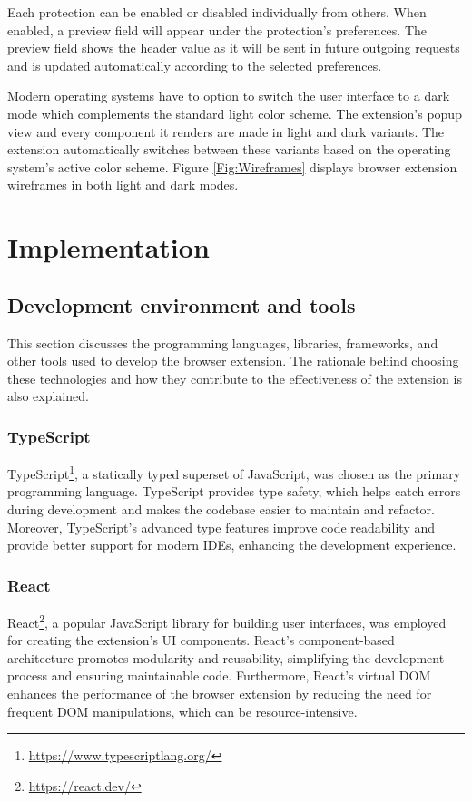 Each protection can be enabled or disabled individually from others. When enabled, a preview field will appear under the protection's preferences. The preview field shows the header value as it will be sent in future outgoing requests and is updated automatically according to the selected preferences.

Modern operating systems have to option to switch the user interface to a dark mode which complements the standard light color scheme. The extension's popup view and every component it renders are made in light and dark variants. The extension automatically switches between these variants based on the operating system's active color scheme. Figure \ref{Fig:Wireframes} displays browser extension wireframes in both light and dark modes.

\chapter{Implementation}


\section{Development environment and tools}

This section discusses the programming languages, libraries, frameworks, and other tools used to develop the browser extension. The rationale behind choosing these technologies and how they contribute to the effectiveness of the extension is also explained.

\subsection{TypeScript}

TypeScript\footnote{\url{https://www.typescriptlang.org/}}, a statically typed superset of JavaScript, was chosen as the primary programming language. TypeScript provides type safety, which helps catch errors during development and makes the codebase easier to maintain and refactor. Moreover, TypeScript's advanced type features improve code readability and provide better support for modern IDEs, enhancing the development experience.

\subsection{React}

React\footnote{\url{https://react.dev/}}, a popular JavaScript library for building user interfaces, was employed for creating the extension's UI components. React's component-based architecture promotes modularity and reusability, simplifying the development process and ensuring maintainable code. Furthermore, React's virtual DOM enhances the performance of the browser extension by reducing the need for frequent DOM manipulations, which can be resource-intensive.

